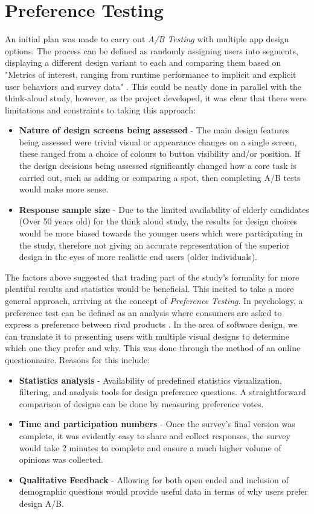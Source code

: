 \section{Preference Testing}
An initial plan was made to carry out \emph{A/B Testing} with multiple app design options. The process can be defined as randomly assigning users into segments, displaying a different design variant to each and comparing them based on "Metrics of interest, ranging from runtime performance to implicit and explicit user behaviors and survey data" \cite{kohavi2009controlled}. This could be neatly done in parallel with the think-aloud study, however, as the project developed, it was clear that there were limitations and constraints to taking this approach:
\begin{itemize}
    \item \textbf{Nature of design screens being assessed} - The main design features being assessed were trivial visual or appearance changes on a single screen, these ranged from a choice of colours to button visibility and/or position. If the design decisions being assessed significantly changed how a core task is carried out, such as adding or comparing a spot, then completing A/B tests would make more sense.
    \item \textbf{Response sample size} - Due to the limited availability of elderly candidates (Over 50 years old) for the think aloud study, the results for design choices would be more biased towards the younger users which were participating in the study, therefore not giving an accurate representation of the superior design in the eyes of more realistic end users (older individuals).
\end{itemize}
The factors above suggested that trading part of the study's formality for more plentiful results and statistics would be beneficial. This incited to take a more general approach, arriving at the concept of \emph{Preference Testing}. In psychology, a preference test can be defined as an analysis where consumers are asked to express a preference between rival products \cite{m.s._2015}. In the area of software design, we can translate it to presenting users with multiple visual designs to determine which one they prefer and why. This was done through the method of an online questionnaire. Reasons for this include:
\begin{itemize}
    \item \textbf{Statistics analysis} - Availability of predefined statistics visualization, filtering, and analysis tools for design preference questions. A straightforward comparison of designs can be done by measuring preference votes. 
    \item \textbf{Time and participation numbers} - Once the survey's final version was complete, it was evidently easy to share and collect responses, the survey would take 2 minutes to complete and ensure a much higher volume of opinions was collected.
    \item \textbf{Qualitative Feedback} - Allowing for both open ended and inclusion of demographic questions would provide useful data in terms of why users prefer design A/B.
\end{itemize}
